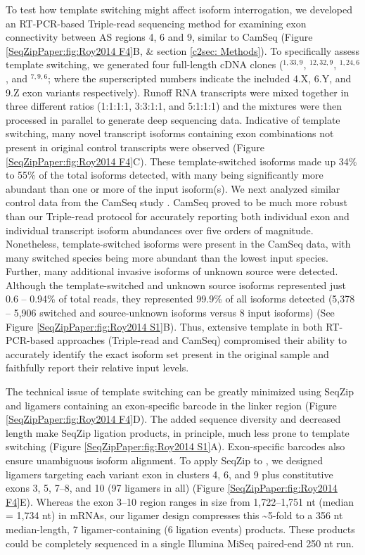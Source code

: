 		To test how template switching might affect \dscam{} isoform interrogation, we developed an RT-PCR-based Triple-read sequencing method for examining exon connectivity between AS regions 4, 6 and 9, similar to CamSeq (Figure \ref{SeqZipPaper:fig:Roy2014 F4}B, \& section \ref{c2sec: Methods}). To specifically assess template switching, we generated four full-length cDNA clones (\dscam{}$^{1,33,9}$, \dscam{}$^{12,32,9}$, \dscam{}$^{1,24,6}$, and \dscam$^{7,9,6}$; where the superscripted numbers indicate the included 4.X, 6.Y, and 9.Z exon variants respectively). Runoff RNA transcripts were mixed together in three different ratios (1:1:1:1, 3:3:1:1, and 5:1:1:1) and the mixtures were then processed in parallel to generate deep sequencing data. Indicative of template switching, many novel transcript isoforms containing exon combinations not present in original control transcripts were observed (Figure \ref{SeqZipPaper:fig:Roy2014 F4}C). These template-switched isoforms made up 34\% to 55\% of the total isoforms detected, with many being significantly more abundant than one or more of the input isoform(s). We next analyzed similar control data from the CamSeq study \citep{Sun2013}. CamSeq proved to be much more robust than our Triple-read protocol for accurately reporting both individual exon and individual transcript isoform abundances over five orders of magnitude. Nonetheless, template-switched isoforms were present in the CamSeq data, with many switched species being more abundant than the lowest input species. Further, many additional invasive isoforms of unknown source were detected. Although the template-switched and unknown source isoforms represented just 0.6 – 0.94\% of total reads, they represented 99.9\% of all isoforms detected (5,378 – 5,906 switched and source-unknown isoforms versus 8 input isoforms) (See Figure \ref{SeqZipPaper:fig:Roy2014 S1}B). Thus, extensive template in both RT-PCR-based approaches (Triple-read and CamSeq) compromised their ability to accurately identify the exact isoform set present in the original sample and faithfully report their relative input levels.

		The technical issue of template switching can be greatly minimized using SeqZip and ligamers containing an exon-specific barcode in the linker region (Figure \ref{SeqZipPaper:fig:Roy2014 F4}D). The added sequence diversity and decreased length make SeqZip ligation products, in principle, much less prone to template switching (Figure \ref{SeqZipPaper:fig:Roy2014 S1}A). Exon-specific barcodes also ensure unambiguous isoform alignment. To apply SeqZip to \dscam{}, we designed ligamers targeting each variant exon in clusters 4, 6, and 9 plus constitutive exons 3, 5, 7–8, and 10 (97 ligamers in all) (Figure \ref{SeqZipPaper:fig:Roy2014 F4}E). Whereas the exon 3–10 region ranges in size from 1,722–1,751 nt (median = 1,734 nt) in \dscam{} mRNAs, our ligamer design compresses this \textasciitilde 5-fold to a 356 nt median-length, 7 ligamer-containing (6 ligation events) products. These products could be completely sequenced in a single Illumina MiSeq paired-end 250 nt run.

